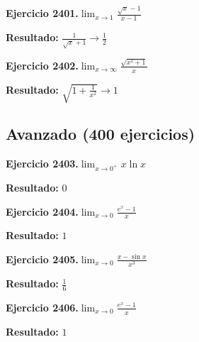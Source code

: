 \documentclass[10pt,a4paper]{article}
\begin{document}
\begin{ejbox}
\textbf{Ejercicio 2401.}\quad $\lim_{x\to 1} \frac{\sqrt{x}-1}{x-1}$
\end{ejbox}

\begin{solbox}
\textbf{Resultado:} \(\displaystyle \frac{1}{\sqrt{x}+1} \to \frac{1}{2}\)
\end{solbox}

\newpage
\begin{ejbox}
\textbf{Ejercicio 2402.}\quad $\lim_{x\to \infty} \frac{\sqrt{x^2+1}}{x}$
\end{ejbox}

\begin{solbox}
\textbf{Resultado:} \(\displaystyle \sqrt{1+\frac{1}{x^2}} \to 1\)
\end{solbox}

\newpage
\subsection{Avanzado (400 ejercicios)}

\begin{ejbox}
\textbf{Ejercicio 2403.}\quad $\lim_{x\to 0^+} x\ln x$
\end{ejbox}

\begin{solbox}
\textbf{Resultado:} \(\displaystyle 0\)
\end{solbox}

\begin{ejbox}
\textbf{Ejercicio 2404.}\quad $\lim_{x\to 0} \frac{e^x-1}{x}$
\end{ejbox}

\begin{solbox}
\textbf{Resultado:} \(\displaystyle 1\)
\end{solbox}

\begin{ejbox}
\textbf{Ejercicio 2405.}\quad $\lim_{x\to 0} \frac{x-\sin x}{x^3}$
\end{ejbox}

\begin{solbox}
\textbf{Resultado:} \(\displaystyle \frac{1}{6}\)
\end{solbox}

\newpage
\begin{ejbox}
\textbf{Ejercicio 2406.}\quad $\lim_{x\to 0} \frac{e^x-1}{x}$
\end{ejbox}

\begin{solbox}
\textbf{Resultado:} \(\displaystyle 1\)
\end{solbox}
\end{document}
